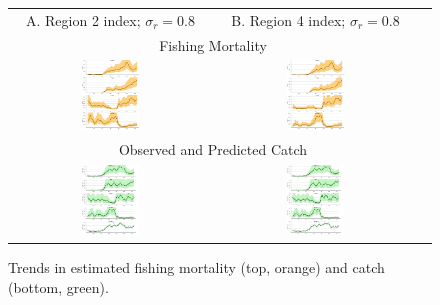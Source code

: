 \documentclass[12pt,letterpaper]{article}
\begin{document}
\begin{figure}
\begin{center}
{\scriptsize \sffamily
\begin{tabular}{ccc}
A. Region 2 index; $\sigma_r=0.8$ &
B. Region 4 index; $\sigma_r=0.8$ &
\\
\multicolumn{2}{c}{Fishing Mortality}\\
\hline
\includegraphics[width=0.30\textwidth]{./4-gear-runs_r2_est_FB1.pdf} &
\includegraphics[width=0.30\textwidth]{./4-gear-runs_r4_est_FB1.pdf} &
\\
\multicolumn{2}{c}{Observed and Predicted Catch}\\
\hline
\includegraphics[width=0.30\textwidth]{./4-gear-runs_r2_est_catchB1.pdf} &
\includegraphics[width=0.30\textwidth]{./4-gear-runs_r4_est_catchB1.pdf} &
\end{tabular}
}
\caption{Trends in estimated fishing mortality (top, orange) and 
catch (bottom, green).
\label{fig:estFC}}
\end{center}
\end{figure}
\end{document}
